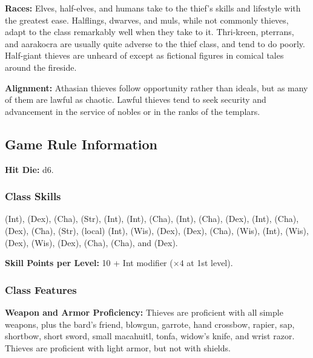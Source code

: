 \textbf{Races:} Elves, half-elves, and humans take to the thief's skills and lifestyle with the greatest ease. Halflings, dwarves, and muls, while not commonly thieves, adapt to the class remarkably well when they take to it. Thri-kreen, pterrans, and aarakocra are usually quite adverse to the thief class, and tend to do poorly. Half-giant thieves are unheard of except as fictional figures in comical tales around the fireside.

\textbf{Alignment:} Athasian thieves follow opportunity rather than ideals, but as many of them are lawful as chaotic. Lawful thieves tend to seek security and advancement in the service of nobles or in the ranks of the templars.

\subsection{Game Rule Information}
\textbf{Hit Die:} d6.

\subsubsection{Class Skills}
 (Int),  (Dex),  (Cha),  (Str),  (Int),  (Int),  (Cha),  (Int),  (Cha),  (Dex),  (Int),  (Cha),  (Dex),  (Cha),  (Str),  (local) (Int),  (Wis),  (Dex),  (Dex),  (Cha),  (Wis),  (Int),  (Wis),  (Dex),  (Wis),  (Dex),  (Cha),  (Cha), and  (Dex).

\textbf{Skill Points per Level:} 10 + Int modifier ($\times4$ at 1st level).

\subsubsection{Class Features}
\textbf{Weapon and Armor Proficiency:} Thieves are proficient with all simple weapons, plus the bard's friend, blowgun, garrote, hand crossbow, rapier, sap, shortbow, short sword, small macahuitl, tonfa, widow's knife, and wrist razor. Thieves are proficient with light armor, but not with shields.


